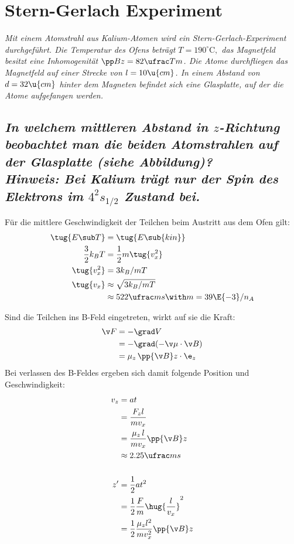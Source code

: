 \documentclass[ex, minted]{exercise_4.0}
\begin{document}
\section{Stern-Gerlach Experiment}
{\it Mit einem Atomstrahl aus Kalium-Atomen wird ein Stern-Gerlach-Experiment durchgeführt. Die Temperatur des Ofens beträgt $T = 190^\circ \mathrm C ,$ das Magnetfeld besitzt eine Inhomogenität $\pp Bz = 82  \ufrac Tm$. Die Atome
durchfliegen das Magnetfeld auf einer Strecke von $l = 10 \u{cm}$. In einem Abstand von $d = 32 \u{cm}$ hinter dem Magneten befindet sich eine Glasplatte, auf der die Atome aufgefangen werden.}

\subsection
{\it In welchem mittleren Abstand in $z$-Richtung beobachtet man die beiden Atomstrahlen auf der Glasplatte (siehe Abbildung)? \\
Hinweis: Bei Kalium trägt nur der Spin des Elektrons im $4^2s_{1/2}$ Zustand bei.}

\dottedlinett

Für die mittlere Geschwindigkeit der Teilchen beim Austritt aus dem Ofen gilt:
\begin{align*}
    \tug{E\sub T} &= \tug{E\sub{kin}}\\ 
    \frac32 k_B  T &= \frac12 m \tug{v_x^2} \\ 
    \tug{v_x^2} &= 3 k_B /m T \\ 
    \tug{v_x} &\approx  \sqrt{3 k_B /m T} \\
    &\approx  522\ufrac ms  \with  m = 39\E{-3} /n_A \\
\end{align*}

Sind die Teilchen ins B-Feld eingetreten, wirkt auf sie die Kraft:
\begin{align*}
    \v F &= -\grad V\\
    &= -\grad (-\v \mu \cdot \v B)\\
    &= \mu_z \,\pp{\v B}z \cdot  \e_z\\
\end{align*}
Bei verlassen des B-Feldes ergeben sich damit folgende Position und Geschwindigkeit:
\begin{align*}
    v_z &= a t\\
    &=  \frac{F_z l}{m v_x}\\ 
    &=  \frac{\mu_z \,l}{m v_x} \pp{\v B}z\\ 
    &\approx 2.25 \ufrac ms\\
    \\
    z' &= \frac 12 a t^2\\
    &= \frac 12 \frac{F}{m} \hug{\frac{l}{v_x}}^2\\
    &= \frac 12 \frac{\mu_z l^2}{m v_x^2} \pp{\v B}z \\
\end{align*} 
\end{document}
